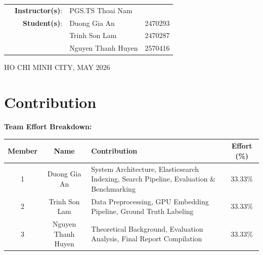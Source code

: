 \begin{titlepage}
\begin{table}[h]
\begin{tabular}{rrll}
\hspace{1 cm} & \textbf{Instructor(s)}: & PGS.TS Thoai Nam\\
        
& \textbf{Student(s)}: & Duong Gia An & 2470293\\
& & Trinh Son Lam & 2470287\\
& & Nguyen Thanh Huyen & 2570416\\

\end {tabular}
\end{table}
\vspace{1cm}
\begin{center}
{\footnotesize HO CHI MINH CITY, MAY 2026}
\end{center}
\end{titlepage}

\newpage

\chapter*{Contribution}

\textbf{Team Effort Breakdown:}

\begin{center}
    \begin{tabular}{|c|c|p{8cm}|c|}
        \hline
        \textbf{Member} & \textbf{Name} & \textbf{Contribution} & \textbf{Effort (\%)} \\
        \hline
        1 & Duong Gia An & System Architecture, Elasticsearch Indexing, Search Pipeline, Evaluation \& Benchmarking & 33.33\% \\
        \hline
        2 & Trinh Son Lam & Data Preprocessing, GPU Embedding Pipeline, Ground Truth Labeling & 33.33\% \\
        \hline
        3 & Nguyen Thanh Huyen & Theoretical Background, Evaluation Analysis, Final Report Compilation & 33.33\% \\
        \hline

    \end{tabular}
\end{center}

\pagestyle{empty}

\clearpage
\tableofcontents


\clearpage
{}
\renewcommand{\listfigurename}{List of Figures}
\listoffigures

